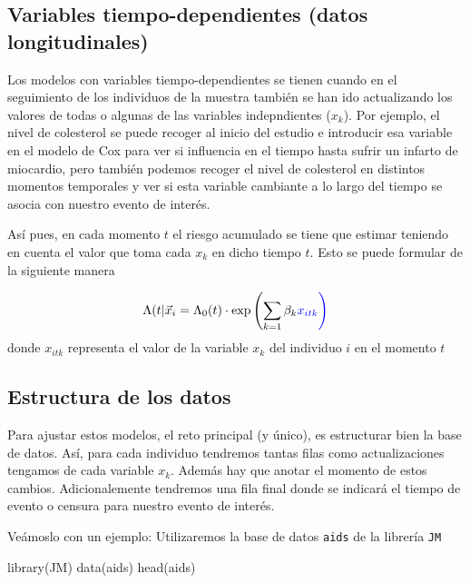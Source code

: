 \documentclass[
]{book}
\newenvironment{Shaded}{\begin{snugshade}}{\end{snugshade}}
\newcommand{\FunctionTok}[1]{\textcolor[rgb]{0.00,0.00,0.00}{#1}}
\newcommand{\NormalTok}[1]{#1}
\begin{document}
\hypertarget{variables-tiempo-dependientes-datos-longitudinales}{%
\subsection{Variables tiempo-dependientes (datos longitudinales)}\label{variables-tiempo-dependientes-datos-longitudinales}}

Los modelos con variables tiempo-dependientes se tienen cuando en el seguimiento de los individuos de la muestra también se han ido actualizando los valores de todas o algunas de las variables indepndientes (\(x_k\)). Por ejemplo, el nivel de colesterol se puede recoger al inicio del estudio e introducir esa variable en el modelo de Cox para ver si influencia en el tiempo hasta sufrir un infarto de miocardio, pero también podemos recoger el nivel de colesterol en distintos momentos temporales y ver si esta variable cambiante a lo largo del tiempo se asocia con nuestro evento de interés.

Así pues, en cada momento \(t\) el riesgo acumulado se tiene que estimar teniendo en cuenta el valor que toma cada \(x_k\) en dicho tiempo \(t\). Esto se puede formular de la siguiente manera

\[\Lambda(t|\vec{x}_i = \Lambda_0(t)\cdot \text{exp}\left(\sum_{k=1} \beta_k \color{blue}{x_{itk}}\right)\]
donde \(x_{itk}\) representa el valor de la variable \(x_k\) del individuo \(i\) en el momento \(t\)

\hypertarget{estructura-de-los-datos-1}{%
\subsection{Estructura de los datos}\label{estructura-de-los-datos-1}}

Para ajustar estos modelos, el reto principal (y único), es estructurar bien la base de datos. Así, para cada individuo tendremos tantas filas como actualizaciones tengamos de cada variable \(x_k\). Además hay que anotar el momento de estos cambios. Adicionalemente tendremos una fila final donde se indicará el tiempo de evento o censura para nuestro evento de interés.

Veámoslo con un ejemplo: Utilizaremos la base de datos \texttt{aids} de la librería \texttt{JM}

\begin{Shaded}
\begin{Highlighting}[]
\FunctionTok{library}\NormalTok{(JM)}
\FunctionTok{data}\NormalTok{(aids)}
\FunctionTok{head}\NormalTok{(aids)}
\end{Highlighting}
\end{Shaded}
\end{document}
